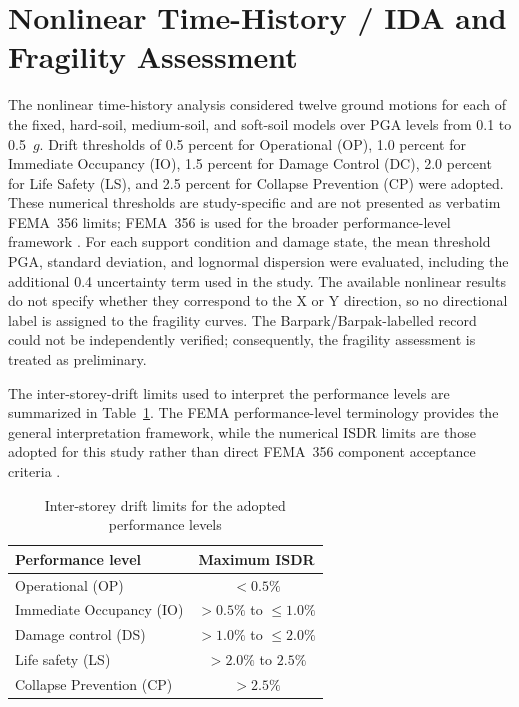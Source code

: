 \section{Nonlinear Time-History / IDA and Fragility Assessment}
The nonlinear time-history analysis considered twelve ground motions for each of the fixed, hard-soil, medium-soil, and soft-soil models over PGA levels from 0.1 to 0.5~$g$. Drift thresholds of 0.5 percent for Operational (OP), 1.0 percent for Immediate Occupancy (IO), 1.5 percent for Damage Control (DC), 2.0 percent for Life Safety (LS), and 2.5 percent for Collapse Prevention (CP) were adopted. These numerical thresholds are study-specific and are not presented as verbatim FEMA~356 limits; FEMA~356 is used for the broader performance-level framework \cite{fema356}. For each support condition and damage state, the mean threshold PGA, standard deviation, and lognormal dispersion were evaluated, including the additional 0.4 uncertainty term used in the study. The available nonlinear results do not specify whether they correspond to the X or Y direction, so no directional label is assigned to the fragility curves. The Barpark/Barpak-labelled record could not be independently verified; consequently, the fragility assessment is treated as preliminary.

The inter-storey-drift limits used to interpret the performance levels are summarized in Table~\ref{tab:legacy_isdr_performance_bands}. The FEMA performance-level terminology provides the general interpretation framework, while the numerical ISDR limits are those adopted for this study rather than direct FEMA~356 component acceptance criteria \cite{fema356}.

\begin{table}[htbp]
\caption{Inter-storey drift limits for the adopted performance levels}
\label{tab:legacy_isdr_performance_bands}
\centering
\begin{tabular}{lc}
\hline\hline
Performance level & Maximum ISDR \\ \hline
Operational (OP) & $<0.5\%$ \\
Immediate Occupancy (IO) & $>0.5\%$ to $\leq 1.0\%$ \\
Damage control (DS) & $>1.0\%$ to $\leq 2.0\%$ \\
Life safety (LS) & $>2.0\%$ to $2.5\%$ \\
Collapse Prevention (CP) & $>2.5\%$ \\ \hline\hline
\end{tabular}
\end{table}


